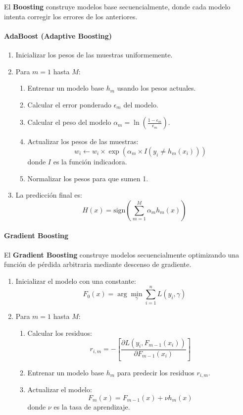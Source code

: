 \documentclass[a4paper, 11pt]{article}
\begin{document}
El \textbf{Boosting} construye modelos base secuencialmente, donde cada modelo intenta corregir los errores de los anteriores.

\paragraph{AdaBoost (Adaptive Boosting)}

\begin{enumerate}
    \item Inicializar los pesos de las muestras uniformemente.
    \item Para $m = 1$ hasta $M$:
    \begin{enumerate}
        \item Entrenar un modelo base $h_m$ usando los pesos actuales.
        \item Calcular el error ponderado $\epsilon_m$ del modelo.
        \item Calcular el peso del modelo $\alpha_m = \ln\left(\frac{1 - \epsilon_m}{\epsilon_m}\right)$.
        \item Actualizar los pesos de las muestras:
        \[
        w_i \leftarrow w_i \times \exp\left(\alpha_m \times I(y_i \neq h_m(x_i))\right)
        \]
        donde $I$ es la función indicadora.
        \item Normalizar los pesos para que sumen 1.
    \end{enumerate}
    \item La predicción final es:
    \[
    H(x) = \text{sign}\left(\sum_{m=1}^{M} \alpha_m h_m(x)\right)
    \]
\end{enumerate}

\paragraph{Gradient Boosting}

El \textbf{Gradient Boosting} construye modelos secuencialmente optimizando una función de pérdida arbitraria mediante descenso de gradiente.

\begin{enumerate}
    \item Inicializar el modelo con una constante:
    \[
    F_0(x) = \arg\min_{\gamma} \sum_{i=1}^{n} L(y_i, \gamma)
    \]
    \item Para $m = 1$ hasta $M$:
    \begin{enumerate}
        \item Calcular los residuos:
        \[
        r_{i,m} = -\left[ \frac{\partial L(y_i, F_{m-1}(x_i))}{\partial F_{m-1}(x_i)} \right]
        \]
        \item Entrenar un modelo base $h_m$ para predecir los residuos $r_{i,m}$.
        \item Actualizar el modelo:
        \[
        F_m(x) = F_{m-1}(x) + \nu h_m(x)
        \]
        donde $\nu$ es la tasa de aprendizaje.
    \end{enumerate}
\end{enumerate}
\end{document}

